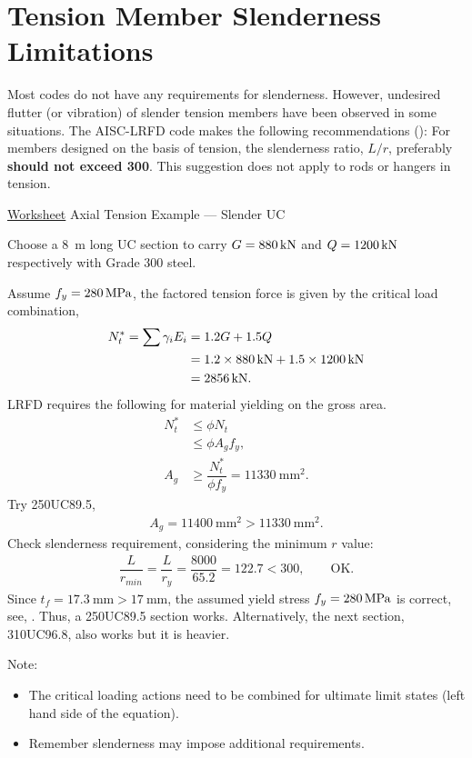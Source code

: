 \section{Tension Member Slenderness Limitations}
Most codes do not have any requirements for slenderness. However, undesired flutter (or vibration) of slender tension members have been observed in some situations. The AISC-LRFD code makes the following recommendations (): For members designed on the basis of tension, the slenderness ratio, $L/r$, preferably \textbf{should not exceed 300}. This suggestion does not apply to rods or hangers in tension.
\begin{exmp}\href{run:./WORKSHEET/CH03/EX3.ATUC.sm}{Worksheet}
Axial Tension Example --- Slender UC

Choose a \SI{8}{\meter} long UC section to carry $G=\SI{880}{\kilo\newton}$ and $Q=\SI{1200}{\kilo\newton}$ respectively with Grade 300 steel.
\end{exmp}
\begin{solution}
Assume $f_y=\SI{280}{\mega\pascal}$, the factored tension force is given by the critical load combination,
\begin{align*}
N^*_t=\sum\gamma_iE_i&=1.2G+1.5Q\\
&=1.2\times\SI{880}{\kilo\newton}+1.5\times\SI{1200}{\kilo\newton}\\
&=\SI{2856}{\kilo\newton}.
\end{align*}
LRFD requires the following for material yielding on the gross area.
\begin{align*}
N^*_t&\leqslant\phi{}N_t\\
&\leqslant\phi{}A_gf_y,\\
A_g&\geqslant\dfrac{N^*_t}{\phi{}f_y}=\SI{11330}{\mm^2}.
\end{align*}
Try 250UC89.5,
\begin{gather*}
A_g=\SI{11400}{\mm^2}>\SI{11330}{\mm^2}.
\end{gather*}
Check slenderness requirement, considering the minimum $r$ value:
\begin{gather*}
\dfrac{L}{r_{min}}=\dfrac{L}{r_y}=\dfrac{8000}{65.2}=\num{122.7}<\num{300},\qquad\text{OK.}
\end{gather*}
Since $t_f=\SI{17.3}{\mm}>\SI{17}{\mm}$, the assumed yield stress $f_y=\SI{280}{\mega\pascal}$ is correct, see, . Thus, a 250UC89.5 section works. Alternatively, the next section, 310UC96.8, also works but it is heavier.

Note:
\begin{itemize}
\item The critical loading actions need to be combined for ultimate limit states (left hand side of the equation).
\item Remember slenderness may impose additional requirements.
\end{itemize}
\end{solution}

